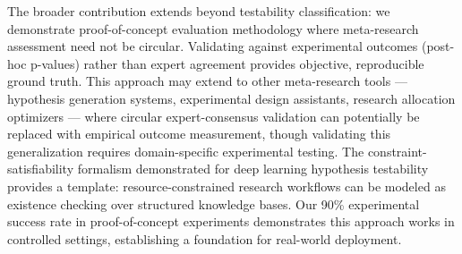 The broader contribution extends beyond testability classification: we demonstrate proof-of-concept evaluation methodology where meta-research assessment need not be circular. Validating against experimental outcomes (post-hoc p-values) rather than expert agreement provides objective, reproducible ground truth. This approach may extend to other meta-research tools --- hypothesis generation systems, experimental design assistants, research allocation optimizers --- where circular expert-consensus validation can potentially be replaced with empirical outcome measurement, though validating this generalization requires domain-specific experimental testing. The constraint-satisfiability formalism demonstrated for deep learning hypothesis testability provides a template: resource-constrained research workflows can be modeled as existence checking over structured knowledge bases. Our 90\% experimental success rate in proof-of-concept experiments demonstrates this approach works in controlled settings, establishing a foundation for real-world deployment.
